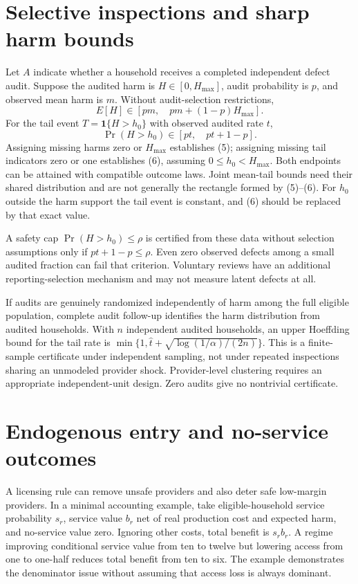 \documentclass[11pt,a4paper]{article}
\begin{document}
\section{Selective inspections and sharp harm bounds}
Let $A$ indicate whether a household receives a completed independent defect audit. Suppose the audited harm is $H\in[0,H_{\max}]$, audit probability is $p$, and observed mean harm is $m$. Without audit-selection restrictions,
\[
 E[H]\in[pm,\quad pm+(1-p)H_{\max}]. \tag{5}
\]
For the tail event $T=\mathbf1\{H>h_0\}$ with observed audited rate $t$,
\[
 \Pr(H>h_0)\in[pt,\quad pt+1-p]. \tag{6}
\]
Assigning missing harms zero or $H_{\max}$ establishes (5); assigning missing tail indicators zero or one establishes (6), assuming $0\le h_0<H_{\max}$. Both endpoints can be attained with compatible outcome laws. Joint mean-tail bounds need their shared distribution and are not generally the rectangle formed by (5)--(6). For $h_0$ outside the harm support the tail event is constant, and (6) should be replaced by that exact value.

A safety cap $\Pr(H>h_0)\le\rho$ is certified from these data without selection assumptions only if $pt+1-p\le\rho$. Even zero observed defects among a small audited fraction can fail that criterion. Voluntary reviews have an additional reporting-selection mechanism and may not measure latent defects at all.

If audits are genuinely randomized independently of harm among the full eligible population, complete audit follow-up identifies the harm distribution from audited households. With $n$ independent audited households, an upper Hoeffding bound for the tail rate is
$\min\{1,\widehat t+\sqrt{\log(1/\alpha)/(2n)}\}$. This is a finite-sample certificate under independent sampling, not under repeated inspections sharing an unmodeled provider shock. Provider-level clustering requires an appropriate independent-unit design. Zero audits give no nontrivial certificate.

\section{Endogenous entry and no-service outcomes}
A licensing rule can remove unsafe providers and also deter safe low-margin providers. In a minimal accounting example, take eligible-household service probability $s_r$, service value $b_r$ net of real production cost and expected harm, and no-service value zero. Ignoring other costs, total benefit is $s_rb_r$. A regime improving conditional service value from ten to twelve but lowering access from one to one-half reduces total benefit from ten to six. The example demonstrates the denominator issue without assuming that access loss is always dominant.
\end{document}
